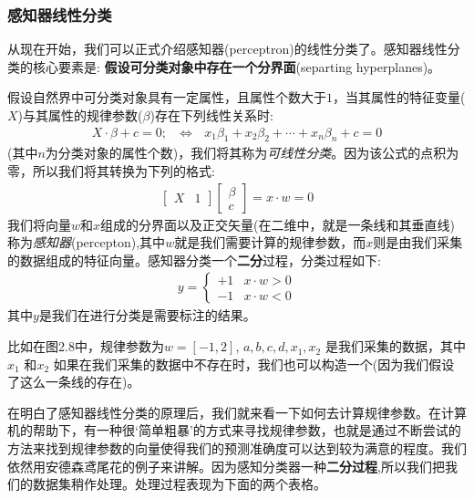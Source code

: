 \documentclass[12pt]{article}
\numberwithin{figure}{section}
\numberwithin{equation}{section}
\begin{document}
\subsubsection{感知器线性分类}

从现在开始，我们可以正式介绍感知器(perceptron)的线性分类了。感知器线性分类的核心要素是: \textbf{假设可分类对象中存在一个分界面}(separting hyperplanes)。


\begin{definition}
	假设自然界中可分类对象具有一定属性，且属性个数大于$1$，当其属性的特征变量($X$)与其属性的规律参数($\beta$)存在下列线性关系时:
	\begin{align*}
		X \cdot \beta + c  =0 ; \ \ \ \Leftrightarrow \ \ \ x_1\beta_1 + x_2 \beta_2 + \cdots + x_n \beta_n + c = 0
	\end{align*}
	(其中$n$为分类对象的属性个数)，我们将其称为\textit{可线性分类}。因为该公式的点积为零，所以我们将其转换为下列的格式:
	\begin{align*}
		\begin{bmatrix}
			X & 1
		\end{bmatrix} \begin{bmatrix}
			\beta \\
			c
		\end{bmatrix} = x \cdot w = 0 
	\end{align*}
	我们将向量$w$和$x$组成的分界面以及正交矢量(在二维中，就是一条线和其垂直线)称为\textit{感知器}(percepton),其中$w$就是我们需要计算的规律参数，而$x$则是由我们采集的数据组成的特征向量。感知器分类一个\textbf{二分}过程，分类过程如下:
	\begin{align*}
		y = \begin{cases}
			+1 & x \cdot w > 0 \\
			-1 & x \cdot w < 0
		\end{cases}
	\end{align*}
	其中$y$是我们在进行分类是需要标注的结果。
\end{definition}

\begin{example}
比如在图2.8中，规律参数为$w = [-1, 2]$, $a, b, c, d, x_1, x_2$ 是我们采集的数据，其中$x_1$ 和$x_2$ 如果在我们采集的数据中不存在时，我们也可以构造一个(因为我们假设了这么一条线的存在)。
\end{example}

在明白了感知器线性分类的原理后，我们就来看一下如何去计算规律参数。在计算机的帮助下，有一种很`简单粗暴’的方式来寻找规律参数，也就是通过不断尝试的方法来找到规律参数的向量使得我们的预测准确度可以达到较为满意的程度。我们依然用安德森鸢尾花的例子来讲解。因为感知分类器一种\textbf{二分过程},所以我们把我们的数据集稍作处理。处理过程表现为下面的两个表格。
\end{document}

